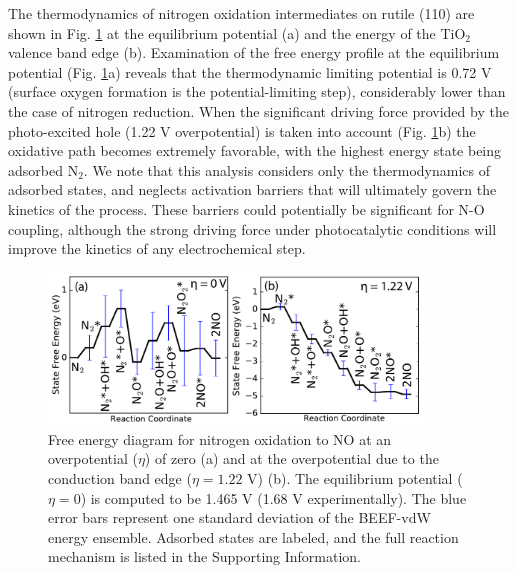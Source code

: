 \documentclass[journal=ascecg,manuscript=article,articletitle=true]{achemso}
\begin{document}
The thermodynamics of nitrogen oxidation intermediates on rutile (110) are shown in Fig. \ref{fig:FED_oxid} at the equilibrium potential (a) and the energy of the TiO$_2$ valence band edge (b). Examination of the free energy profile at the equilibrium potential (Fig. \ref{fig:FED_oxid}a) reveals that the thermodynamic limiting potential is 0.72 V (surface oxygen formation is the potential-limiting step), considerably lower than the case of nitrogen reduction. When the significant driving force provided by the photo-excited hole (1.22 V overpotential) is taken into account (Fig. \ref{fig:FED_oxid}b) the oxidative path becomes extremely favorable, with the highest energy state being adsorbed N$_2$. We note that this analysis considers only the thermodynamics of adsorbed states, and neglects activation barriers that will ultimately govern the kinetics of the process. These barriers could potentially be significant for N-O coupling, although the strong driving force under photocatalytic conditions will improve the kinetics of any electrochemical step.

\begin{figure}
\includegraphics[width=0.9\textwidth]{figures/oxidative_FED.pdf}
\caption{Free energy diagram for nitrogen oxidation to NO at an overpotential ($\eta$) of zero (a) and at the overpotential due to the conduction band edge ($\eta=1.22$ V) (b). The equilibrium potential ($\eta=0$) is computed to be 1.465 V (1.68 V experimentally). The blue error bars represent one standard deviation of the BEEF-vdW energy ensemble. Adsorbed states are labeled, and the full reaction mechanism is listed in the Supporting Information.}
\label{fig:FED_oxid}
\end{figure}
\end{document}
